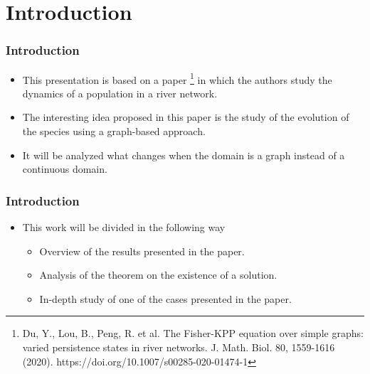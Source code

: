 \section{Introduction}


\begin{frame}
    \frametitle{Introduction}
    \begin{itemize}
        \item This presentation is based on a paper \footnote{Du, Y., Lou, B., Peng, R. et al. The Fisher-KPP equation over simple graphs: varied persistence states in river networks. J. Math. Biol. 80, 1559-1616 (2020). https://doi.org/10.1007/s00285-020-01474-1} in which the authors study the dynamics of a population in a river network.
        \item The interesting idea proposed in this paper is the study of the evolution of the species using a graph-based approach. 
        \item It will be analyzed what changes when the domain is a graph instead of a continuous domain.
    \end{itemize}
\end{frame}


\begin{frame}
    \frametitle{Introduction}
    \begin{itemize}
        \item This work will be divided in the following way
        \begin{itemize}
            \item Overview of the results presented in the paper.
            \item Analysis of the theorem on the existence of a solution.
            \item In-depth study of one of the cases presented in the paper.
        \end{itemize}
    \end{itemize}
\end{frame}

